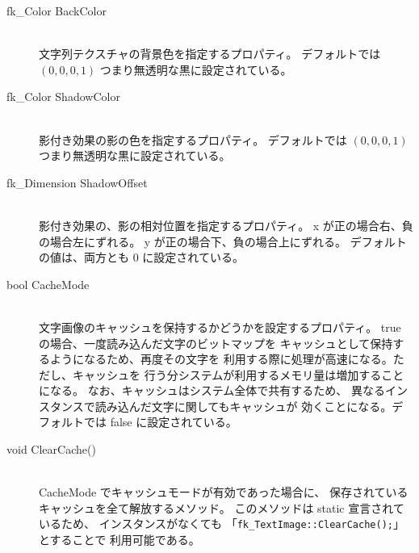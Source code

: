 \begin{description}
\item[fk\_Color BackColor] ~ \\
	文字列テクスチャの背景色を指定するプロパティ。
	デフォルトでは \((0, 0, 0, 1)\) つまり無透明な黒に設定されている。\\

\item[fk\_Color ShadowColor] ~ \\
	影付き効果の影の色を指定するプロパティ。
	デフォルトでは \((0, 0, 0, 1)\) つまり無透明な黒に設定されている。\\

\item[fk\_Dimension ShadowOffset] ~ \\
	影付き効果の、影の相対位置を指定するプロパティ。
	x が正の場合右、負の場合左にずれる。
	y が正の場合下、負の場合上にずれる。
	デフォルトの値は、両方とも 0 に設定されている。\\

\item[bool CacheMode] ~ \\
	文字画像のキャッシュを保持するかどうかを設定するプロパティ。
	true の場合、一度読み込んだ文字のビットマップを
	キャッシュとして保持するようになるため、再度その文字を
	利用する際に処理が高速になる。ただし、キャッシュを
	行う分システムが利用するメモリ量は増加することになる。
	なお、キャッシュはシステム全体で共有するため、
	異なるインスタンスで読み込んだ文字に関してもキャッシュが
	効くことになる。デフォルトでは false に設定されている。\\

\item[void ClearCache()] ~ \\
	CacheMode でキャッシュモードが有効であった場合に、
	保存されているキャッシュを全て解放するメソッド。
	このメソッドは static 宣言されているため、
	インスタンスがなくても
	「\verb+fk_TextImage::ClearCache();+」とすることで
	利用可能である。
\end{description}


